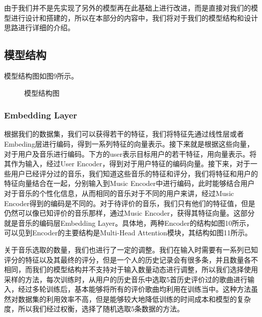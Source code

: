 由于我们并不是先实现了另外的模型再在此基础上进行改进，而是直接对我们的模型进行设计和搭建的，所以在本部分的内容中，我们将对于我们的模型结构和设计思路进行详细的介绍。
\subsection{模型结构}
模型结构图如图9所示。
\begin{figure}[htb]        
\caption{\label{4} 模型结构图}      
\end{figure}

\subsubsection{Embedding Layer}
根据我们的数据集，我们可以获得若干的特征，我们将特征先通过线性层或者Embeding层进行编码，得到一系列特征的向量表示。接下来就是根据这些向量，对于用户及音乐进行编码。下方的user表示目标用户的若干特征，用向量表示。将其作为输入，经过User Encoder，得到对于用户特征的编码向量。接下来，对于一些用户已经评分过的音乐，我们知道这些音乐的特征和评分，我们将特征和用户的特征向量结合在一起，分别输入到Music Encoder中进行编码，此时能够结合用户对于音乐的个性化信息，从而相同的音乐对于不同的用户来讲，经过Music Encoder得到的编码是不同的。对于待评价的音乐，我们只有他们的特征值，但是仍然可以像已知评价的音乐那样，通过Music Encoder，获得其特征向量。这部分就是音乐的编码层Embedding Layer。具体地，两种Encoder的结构如图10所示，可以见到Encoder的主要结构是Multi-Head Attention\cite{vaswani2017attention}模块，其结构如图11所示。

关于音乐选取的数量，我们也进行了一定的调整。我们在输入时需要有一系列已知评分的特征以及其最终的评分，但是一个人的历史记录会有很多条，并且数量各不相同，而我们的模型结构并不支持对于输入数量动态进行调整，所以我们选择使用采样的方法，每次训练时，从用户的历史音乐中选取5首历史评价过的歌曲进行输入，经过多轮训练后，基本能够将所有的评价歌曲均利用在训练当中。这种方法虽然对数据集的利用效率不高，但是能够较大地降低训练的时间成本和模型的复杂度，所以我们经过权衡，选择了随机选取5条数据的方法。

